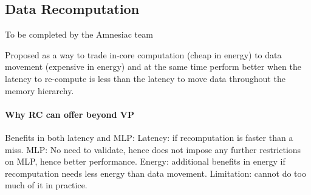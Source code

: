 \subsection{Data Recomputation}
\label{sec:recmp}

{\color{red} To be completed by the Amnesiac team}

{\color{blue} Proposed as a way to trade in-core computation (cheap in energy) to data movement (expensive in energy) and at the same time perform better when the latency to re-compute is less than the latency to move data throughout the memory hierarchy.
\paragraph{Why RC can offer beyond VP}
Benefits in both latency and MLP: Latency: if recomputation is faster than a miss. MLP: No need to validate, hence does not impose any further restrictions on MLP, hence better performance. Energy: additional benefits in energy if recomputation needs less energy than data movement. Limitation: cannot do too much of it in practice. }



 